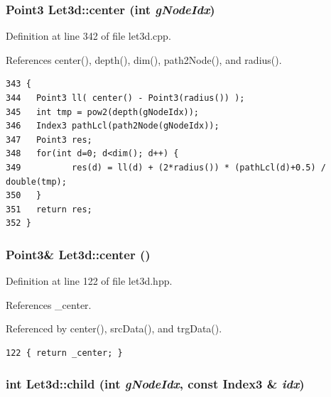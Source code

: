 \subsubsection{\setlength{\rightskip}{0pt plus 5cm}Point3 Let3d::center (int {\em g\-Node\-Idx})}\label{classLet3d_dff5f922c11176af18f4bfa95c138a20_dff5f922c11176af18f4bfa95c138a20}




Definition at line 342 of file let3d.cpp.

References center(), depth(), dim(), path2Node(), and radius().

\footnotesize\begin{verbatim}343 {
344   Point3 ll( center() - Point3(radius()) );
345   int tmp = pow2(depth(gNodeIdx));
346   Index3 pathLcl(path2Node(gNodeIdx));
347   Point3 res;
348   for(int d=0; d<dim(); d++) {
349          res(d) = ll(d) + (2*radius()) * (pathLcl(d)+0.5) / double(tmp);
350   }
351   return res;
352 }
\end{verbatim}\normalsize 


\subsubsection{\setlength{\rightskip}{0pt plus 5cm}Point3\& Let3d::center ()\hspace{0.3cm}{\tt  [inline]}}\label{classLet3d_5c0517b22b09f08712cbfd01aa1f29d7_5c0517b22b09f08712cbfd01aa1f29d7}




Definition at line 122 of file let3d.hpp.

References \_\-center.

Referenced by center(), src\-Data(), and trg\-Data().

\footnotesize\begin{verbatim}122 { return _center; }
\end{verbatim}\normalsize 


\subsubsection{\setlength{\rightskip}{0pt plus 5cm}int Let3d::child (int {\em g\-Node\-Idx}, const Index3 \& {\em idx})}\label{classLet3d_127278ccf71ca1d7a807d7531be1ad40_127278ccf71ca1d7a807d7531be1ad40}




